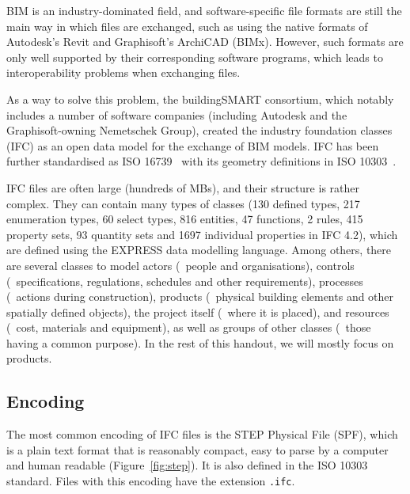 BIM is an industry-dominated field, and software-specific file formats are still the main way in which files are exchanged, such as using the native formats of Autodesk's Revit and Graphisoft's ArchiCAD (BIMx).
However, such formats are only well supported by their corresponding software programs, which leads to interoperability problems when exchanging files.

As a way to solve this problem, the buildingSMART consortium, which notably includes a number of software companies (including Autodesk and the Graphisoft-owning Nemetschek Group), created the industry foundation classes (IFC) as an open data model for the exchange of BIM models.
IFC has been further standardised as ISO 16739~\citep{ISO16739:2013} with its geometry definitions in ISO 10303~\citep{ISO10303:2014}.

IFC files are often large (hundreds of MBs), and their structure is rather complex.
They can contain many types of classes (130 defined types, 217 enumeration types, 60 select types, 816 entities, 47 functions, 2 rules, 415 property sets, 93 quantity sets and 1697 individual properties in IFC 4.2), which are defined using the EXPRESS data modelling language.
Among others, there are several classes to model actors (\eg\ people and organisations), controls (\eg\ specifications, regulations, schedules and other requirements), processes (\eg\ actions during construction), products (\eg\ physical building elements and other spatially defined objects), the project itself (\eg\ where it is placed), and resources (\eg\ cost, materials and equipment), as well as groups of other classes (\eg\ those having a common purpose).
In the rest of this handout, we will mostly focus on products.

\subsection{Encoding}

The most common encoding of IFC files is the STEP Physical File (SPF), which is a plain text format that is reasonably compact, easy to parse by a computer and human readable (Figure~\ref{fig:step}).
It is also defined in the ISO 10303 standard.
Files with this encoding have the extension \texttt{.ifc}.

